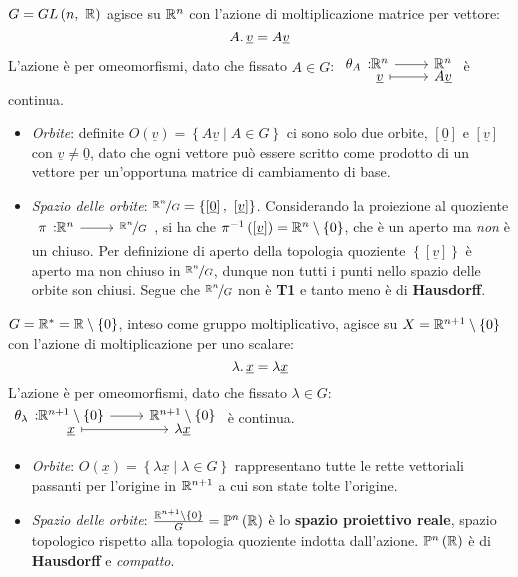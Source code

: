 \begin{example}
$G=GL\left(n,\ \mathbb{R}\right)$ agisce su $\mathbb{R}^n$ con l'azione di moltiplicazione matrice per vettore:
\begin{equation}
	A\ldotp \underline{v} = A\underline{v}
\end{equation}
L'azione è per omeomorfismi, dato che fissato $A\in G$: $\funztot{\theta_A}{\realset^n}{\realset^n}{\underline{v}}{A\underline{v}}$ è continua.
\begin{itemize}
	\item \textit{Orbite}: definite $O\left(\underline{v}\right)=\left\{A\underline{v}\mid A\in G\right\}$ ci sono solo due orbite, $\left[\underline{0}\right]$ e $\left[\underline{v}\right]$ con $\underline{v}\neq\underline{0}$, dato che ogni vettore può essere scritto come prodotto di un vettore per un'opportuna matrice di cambiamento di base.
	\item \textit{Spazio delle orbite}: $\nicefrac{\realset^n}{G}=\left\{\left[\underline{0}\right],\ \left[\underline{v}\right]\right\}$. Considerando la proiezione al quoziente $\funz{\pi}{\realset^n}{\nicefrac{\realset^n}{G}}$, si ha che $\pi^{-1}\left(\left[\underline{v}\right]\right)=\mathbb{R}^n\setminus\left\{0\right\}$, che è un aperto ma \textit{non} è un chiuso. Per definizione di aperto della topologia quoziente $\left\{\left[\underline{v}\right]\right\}$ è aperto ma non chiuso in $\nicefrac{\mathbb{R}^n}{G}$, dunque non tutti i punti nello spazio delle orbite son chiusi. Segue che $\nicefrac{\mathbb{R}^n}{G}$ non è \textbf{T1} e tanto meno è di \textbf{Hausdorff}.
\end{itemize}
\end{example}
\begin{example}
	$G=\mathbb{R}^{\ast}=\mathbb{R}\setminus\left\{0\right\}$, inteso come gruppo moltiplicativo, agisce su $X=\mathbb{R}^{n+1}\setminus\left\{0\right\}$ con l'azione di moltiplicazione per uno scalare:
	\begin{equation}
		\lambda\ldotp \underline{x} = \lambda\underline{x}
	\end{equation}
L'azione è per omeomorfismi, dato che fissato $\lambda\in G$: $\funztot{\theta_\lambda}{\realset^{n+1}\setminus\left\{0\right\}}{\realset^{n+1}\setminus\left\{0\right\}}{\underline{x}}{\lambda \underline{x}}$ è continua.
\begin{itemize}
	\item \textit{Orbite}: $O\left(\underline{x}\right)=\left\{\lambda \underline{x}\mid \lambda\in G\right\}$ rappresentano tutte le rette vettoriali passanti per l'origine in $\mathbb{R}^{n+1}$ a cui son state tolte l'origine.
	\item \textit{Spazio delle orbite}: $\frac{\realset^{n+1}\setminus\left\{0\right\}}{G}=\proj[n]{\realset}$ è lo \textbf{spazio proiettivo reale}, spazio topologico rispetto alla topologia quoziente indotta dall'azione. $\proj[n]{\realset}$ è di \textbf{Hausdorff} e \textit{compatto}.
\end{itemize}
\end{example}
